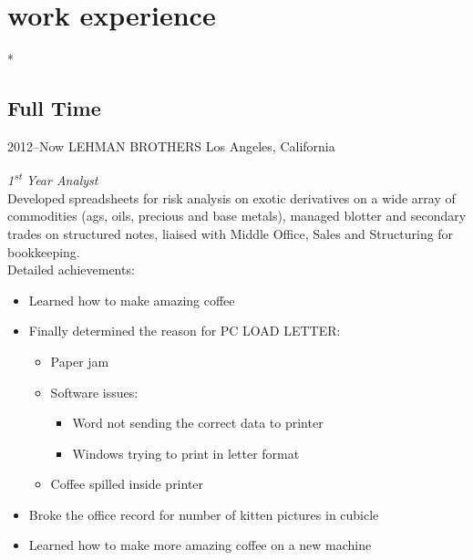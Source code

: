 \documentclass[]{friggeri-cv} %
\begin{document}
\pagebreak 

\section{work experience}

\/*

\subsection{Full Time}

\begin{entrylist}
	

\entry
{2012--Now}
{LEHMAN BROTHERS}
{Los Angeles, California}
{\emph{1\textsuperscript{st} Year Analyst} \\
	Developed spreadsheets for risk analysis on exotic derivatives on a wide array of commodities (ags, oils, precious and base metals), managed blotter and secondary trades on structured notes, liaised with Middle Office, Sales and Structuring for bookkeeping. \\
	Detailed achievements:
	\begin{itemize}
		\item Learned how to make amazing coffee
		\item Finally determined the reason for \textsc{PC LOAD LETTER}:
		\begin{itemize}
			\item Paper jam
			\item Software issues:
			\begin{itemize}
				\item Word not sending the correct data to printer
				\item Windows trying to print in letter format
			\end{itemize}
			\item Coffee spilled inside printer
		\end{itemize}
		\item Broke the office record for number of kitten pictures in cubicle
		\item Learned how to make more amazing coffee on a new machine
	\end{itemize}}
	
	
\end{entrylist}
\end{document}

